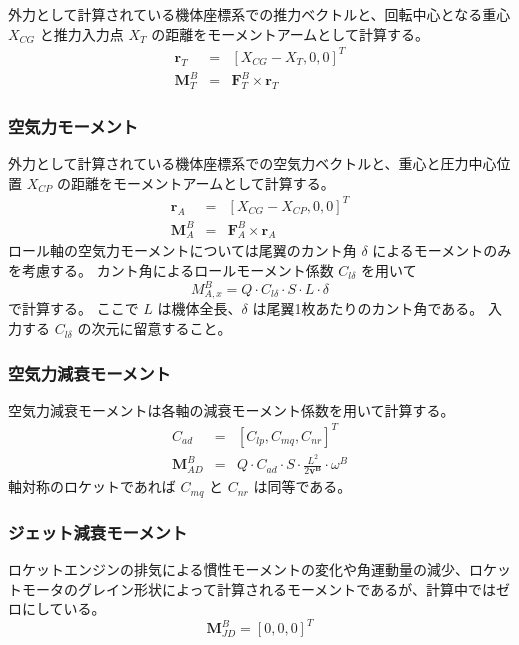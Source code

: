 ﻿\documentclass[a4paper]{jsarticle}
\begin{document}
外力として計算されている機体座標系での推力ベクトルと、回転中心となる重心 $X_{CG}$ と推力入力点 $X_T$ の距離をモーメントアームとして計算する。
\begin{eqnarray}
\bm{r}_T &=& [X_{CG} - X_T, 0, 0]^T \\
\bm{M}^B_T &=& \bm{F}^B_T \times \bm{r}_T
\end{eqnarray}

\subsubsection{空気力モーメント}
外力として計算されている機体座標系での空気力ベクトルと、重心と圧力中心位置 $X_{CP}$ の距離をモーメントアームとして計算する。
\begin{eqnarray}
\bm{r}_A &=& [X_{CG} - X_{CP}, 0, 0]^T \\
\bm{M}^B_A &=& \bm{F}^B_A \times \bm{r}_A
\end{eqnarray}
ロール軸の空気力モーメントについては尾翼のカント角 $\delta$ によるモーメントのみを考慮する。
カント角によるロールモーメント係数 $C_{l\delta}$ を用いて
\begin{equation}
M^B_{A,x} = Q \cdot C_{l\delta} \cdot S \cdot L \cdot \delta
\end{equation}
で計算する。
ここで $L$ は機体全長、$\delta$ は尾翼1枚あたりのカント角である。
入力する $C_{l\delta}$ の次元に留意すること。

\subsubsection{空気力減衰モーメント}
空気力減衰モーメントは各軸の減衰モーメント係数を用いて計算する。
\begin{eqnarray}
C_{ad} &=& [C_{lp}, C_{mq}, C_{nr}]^T \\
\bm{M}^B_{AD} &=& Q \cdot C_{ad} \cdot S \cdot \frac{L^2}{2 \bm{v^B}} \cdot \omega^B
\end{eqnarray}
軸対称のロケットであれば $C_{mq}$ と $C_{nr}$ は同等である。

\subsubsection{ジェット減衰モーメント}
ロケットエンジンの排気による慣性モーメントの変化や角運動量の減少、ロケットモータのグレイン形状によって計算されるモーメントであるが、計算中ではゼロにしている。
\begin{equation}
\bm{M}^B_{JD} = [0, 0, 0]^T
\end{equation}
\end{document}
